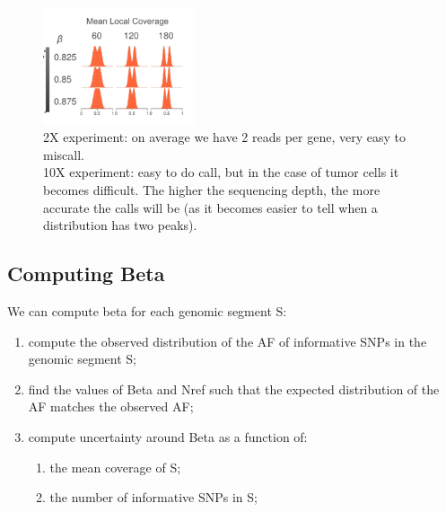 \begin{figure}[H]
	\centering
	\includegraphics[width=0.4\textwidth]{beta.png}
	\caption{2X experiment: on average we have 2 reads per gene, very easy to miscall.\\
10X experiment: easy to do call, but in the case of tumor cells it becomes difficult. The higher the sequencing depth, the more accurate the calls will be (as it becomes easier to tell when a distribution has two peaks).
}
\label{fig:beta}
\end{figure}

\subsection{Computing Beta}
We can compute beta for each genomic segment S:
\begin{enumerate}
\item compute the observed distribution of the AF of informative SNPs in the genomic segment S;
\item find the values of Beta and Nref such that the expected distribution of the AF matches the observed AF;
\item compute uncertainty around Beta as a function of:
	\begin{enumerate}
	\item the mean coverage of S;
	\item the number of informative SNPs in S;
	\end{enumerate}
\end{enumerate}


